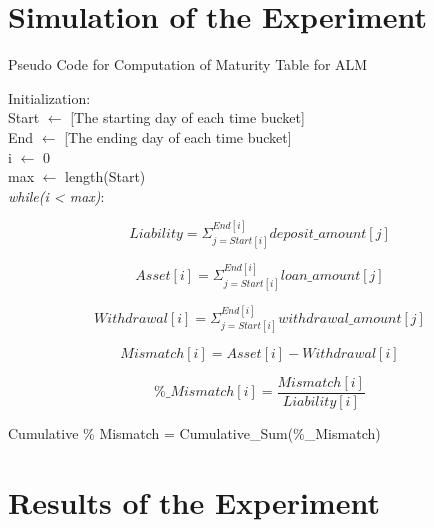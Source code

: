 \section{Simulation of the Experiment}

\begin{algorithm}[H]

\caption{Pseudo Code for Computation of Maturity Table for ALM}

\begin{algorithmic}[1] 
						
\STATE Initialization:\\
Start $\gets$ [The starting day of each time bucket] \\
End $\gets$ [The ending day of each time bucket] \\
i $\gets$ 0\\
max $\gets$ length(Start)\\

\STATE \emph{while(i < max)}:

\STATE \tab \begin{equation}
Liability = \Sigma_{j = Start[i]}^{End[i]} deposit\_amount[j]
\end{equation}

\STATE \tab \begin{equation}
Asset[i] = \Sigma_{j = Start[i]}^{End[i]} loan\_amount[j]
\end{equation}

\STATE \tab \begin{equation}
Withdrawal[i] = \Sigma_{j = Start[i]}^{End[i]} withdrawal\_amount[j]
\end{equation}

\STATE \tab \begin{equation}
Mismatch[i] = Asset[i] - Withdrawal[i] 
\end{equation}

\STATE \tab \begin{equation}
\%\_Mismatch[i] = \frac{Mismatch[i]}{Liability[i]}
\end{equation}

\STATE Cumulative \% Mismatch = Cumulative\_Sum(\%\_Mismatch)

\end{algorithmic}

\end{algorithm}

\section{Results of the Experiment}


